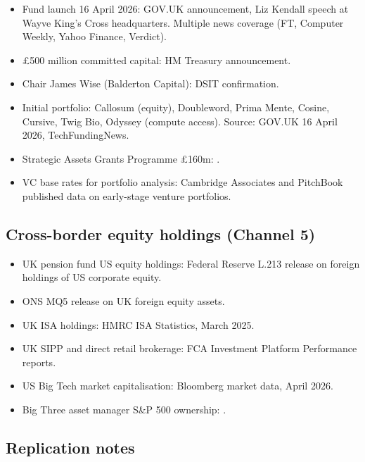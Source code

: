\documentclass[11pt,letterpaper]{article}
\theoremstyle{remark}
\begin{document}
\begin{itemize}
\item Fund launch 16 April 2026: GOV.UK announcement, Liz Kendall speech at Wayve King's Cross headquarters. Multiple news coverage (FT, Computer Weekly, Yahoo Finance, Verdict).
\item £500 million committed capital: HM Treasury announcement.
\item Chair James Wise (Balderton Capital): DSIT confirmation.
\item Initial portfolio: Callosum (equity), Doubleword, Prima Mente, Cosine, Cursive, Twig Bio, Odyssey (compute access). Source: GOV.UK 16 April 2026, TechFundingNews.
\item Strategic Assets Grants Programme \pounds160m: \citet{dsit_2026}.
\item VC base rates for portfolio analysis: Cambridge Associates and PitchBook published data on early-stage venture portfolios.
\end{itemize}

\subsection{Cross-border equity holdings (Channel 5)}

\begin{itemize}
\item UK pension fund US equity holdings: Federal Reserve L.213 release on foreign holdings of US corporate equity.
\item ONS MQ5 release on UK foreign equity assets.
\item UK ISA holdings: HMRC ISA Statistics, March 2025.
\item UK SIPP and direct retail brokerage: FCA Investment Platform Performance reports.
\item US Big Tech market capitalisation: Bloomberg market data, April 2026.
\item Big Three asset manager S\&P 500 ownership: \citet{braun_christophers_2024}.
\end{itemize}

\subsection{Replication notes}
\end{document}

